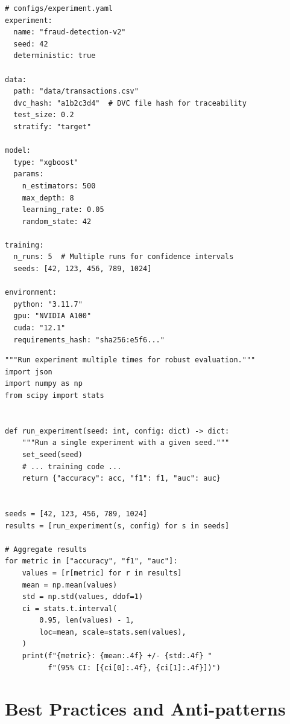 \begin{codeblock}[title=\textbf{Reproducibility configuration}]
\begin{verbatim}
# configs/experiment.yaml
experiment:
  name: "fraud-detection-v2"
  seed: 42
  deterministic: true

data:
  path: "data/transactions.csv"
  dvc_hash: "a1b2c3d4"  # DVC file hash for traceability
  test_size: 0.2
  stratify: "target"

model:
  type: "xgboost"
  params:
    n_estimators: 500
    max_depth: 8
    learning_rate: 0.05
    random_state: 42

training:
  n_runs: 5  # Multiple runs for confidence intervals
  seeds: [42, 123, 456, 789, 1024]

environment:
  python: "3.11.7"
  gpu: "NVIDIA A100"
  cuda: "12.1"
  requirements_hash: "sha256:e5f6..."
\end{verbatim}
\end{codeblock}

\begin{codeblock}[title=\textbf{Multi-run experiment with statistics}]
\begin{verbatim}
"""Run experiment multiple times for robust evaluation."""
import json
import numpy as np
from scipy import stats


def run_experiment(seed: int, config: dict) -> dict:
    """Run a single experiment with a given seed."""
    set_seed(seed)
    # ... training code ...
    return {"accuracy": acc, "f1": f1, "auc": auc}


seeds = [42, 123, 456, 789, 1024]
results = [run_experiment(s, config) for s in seeds]

# Aggregate results
for metric in ["accuracy", "f1", "auc"]:
    values = [r[metric] for r in results]
    mean = np.mean(values)
    std = np.std(values, ddof=1)
    ci = stats.t.interval(
        0.95, len(values) - 1,
        loc=mean, scale=stats.sem(values),
    )
    print(f"{metric}: {mean:.4f} +/- {std:.4f} "
          f"(95% CI: [{ci[0]:.4f}, {ci[1]:.4f}])")
\end{verbatim}
\end{codeblock}

\section{Best Practices and Anti-patterns}

